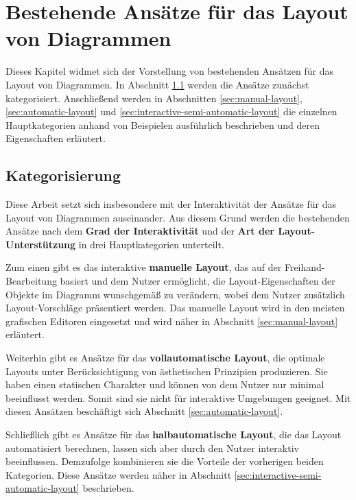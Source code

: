 
\chapter{Bestehende Ansätze für das Layout von Diagrammen}
\label{chapter:existing-approaches}

Dieses Kapitel widmet sich der Vorstellung von bestehenden Ansätzen für das Layout von Diagrammen. In Abschnitt \ref{sec:categorization} werden die Ansätze zunächst kategorisiert. Anschließend werden in Abschnitten \ref{sec:manual-layout}, \ref{sec:automatic-layout} und \ref{sec:interactive-semi-automatic-layout} die einzelnen Hauptkategorien anhand von Beispielen ausführlich beschrieben und deren Eigenschaften erläutert.

\section{Kategorisierung}
\label{sec:categorization}

Diese Arbeit setzt sich insbesondere mit der Interaktivität der Ansätze für das Layout von Diagrammen auseinander. Aus diesem Grund werden die bestehenden Ansätze nach dem \textbf{Grad der Interaktivität} und der \textbf{Art der Layout-Unterstützung} in drei Hauptkategorien unterteilt.

Zum einen gibt es das interaktive \textbf{manuelle Layout}, das auf der Freihand-Bearbeitung basiert und dem Nutzer ermöglicht, die Layout-Eigenschaften der Objekte im Diagramm wunschgemäß zu verändern, wobei dem Nutzer zusätzlich Layout-Vorschläge präsentiert werden. Das manuelle Layout wird in den meisten grafischen Editoren eingesetzt und wird näher in Abschnitt \ref{sec:manual-layout} erläutert.

Weiterhin gibt es Ansätze für das \textbf{vollautomatische Layout}, die optimale Layouts unter Berücksichtigung von ästhetischen Prinzipien produzieren. Sie haben einen statischen Charakter und können von dem Nutzer nur minimal beeinflusst werden. Somit sind sie nicht für interaktive Umgebungen geeignet. Mit diesen Ansätzen beschäftigt sich Abschnitt \ref{sec:automatic-layout}.

Schließlich gibt es Ansätze für das \textbf{halbautomatische Layout}, die das Layout automatisiert berechnen, lassen sich aber durch den Nutzer interaktiv beeinflussen. Demzufolge kombinieren sie die Vorteile der vorherigen beiden Kategorien. Diese Ansätze werden näher in Abschnitt \ref{sec:interactive-semi-automatic-layout} beschrieben.

